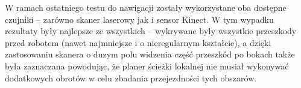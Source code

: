 W ramach ostatniego testu do nawigacji zostały wykorzystane oba dostępne czujniki 
-- zarówno skaner laserowy jak i sensor Kinect. W tym wypadku rezultaty były 
najlepsze ze wszystkich -- wykrywane były wszystkie przeszkody przed robotem
(nawet najmniejsze i o nieregularnym kształcie), a dzięki zastosowaniu skanera
o duzym polu widzenia część przeszkód po bokach także była zaznaczana powodując,
że planer ścieżki lokalnej nie musiał wykonywać dodatkowych obrotów w celu 
zbadania przejezdności tych obszarów.
